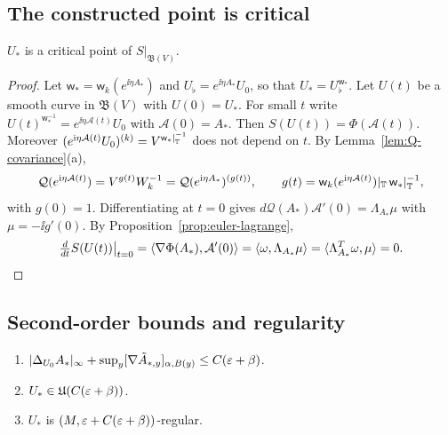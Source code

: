\subsection{The constructed point is critical}\label{ss:27.3}

\begin{proposition}\label{prop:critical}
$U_*$ is a critical point of $S|_{\mathfrak B(V)}$.
\end{proposition}

\begin{proof}
Let $\mathsf w_*=\mathsf w_k(e^{\ii\eta A_*})$ and $U_\flat=e^{\ii\eta A_*}U_0$, so that $U_*=U_\flat^{\mathsf w_*}$. Let $U(t)$ be a smooth curve in $\mathfrak B(V)$ with $U(0)=U_*$. For small $t$ write $U(t)^{\mathsf w_*^{-1}}=e^{\ii\eta\mathcal A(t)}U_0$ with $\mathcal A(0)=A_*$. Then $S(U(t))=\Phi(\mathcal A(t))$. Moreover $(e^{\mathrm i\eta\mathcal A(t)}U_0)^{(k)}=V^{\mathsf w_*|_\mathbb T^{-1}}$ does not depend on $t$. By Lemma~\ref{lem:Q-covariance}(a),
\[
\mathcal Q(e^{\mathrm i\eta\mathcal A(t)})=V^{g(t)}W_k^{-1}=\mathcal Q(e^{\mathrm i\eta A_*})^{(g(t))},\qquad g(t)=\mathsf w_k(e^{\mathrm i\eta\mathcal A(t)})|_\mathbb T\,\mathsf w_*|_\mathbb T^{-1},
\]
with $g(0)=1$. Differentiating at $t=0$ gives $d\mathcal Q(A_*)\mathcal A'(0)=\Lambda_{A_*}\mu$ with $\mu=-\ii g'(0)$. By Proposition~\ref{prop:euler-lagrange},
\[
\tfrac{d}{dt}S(U(t))\big|_{t=0}=\langle \nabla\Phi(A_*),\mathcal A'(0)\rangle=\langle \omega,\Lambda_{A_*}\mu\rangle=\langle \Lambda_{A_*}^T\omega,\mu\rangle=0.\qedhere
\]
\end{proof}

\subsection{Second-order bounds and regularity}\label{ss:27.4}

\begin{proposition}\label{prop:minimizer-regularity}
\begin{enumerate}[label=(\alph*)]
\item $|\Delta_{U_0}A_*|_\infty+\sup_y[\nabla\tilde A_{*,y}]_{\alpha,B(y)}\le C(\varepsilon+\beta)$.
\item $U_*\in\mathfrak U(C(\varepsilon+\beta))$.
\item $U_*$ is $(M,\varepsilon+C(\varepsilon+\beta))$-regular.
\end{enumerate}
\end{proposition}

